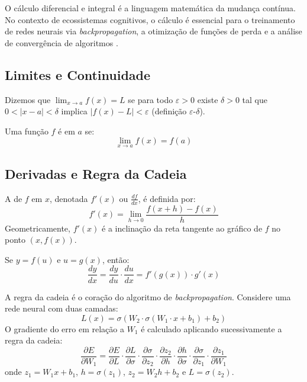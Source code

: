 O cálculo diferencial e integral é a linguagem matemática da mudança
contínua. No contexto de ecossistemas cognitivos, o cálculo é essencial para
o treinamento de redes neurais via \textit{backpropagation}, a otimização de
funções de perda e a análise de convergência de algoritmos
\cite{goodfellow2016deep, bishop2006pattern}.

\subsection{Limites e Continuidade}

\begin{definicao}
    Dizemos que $\lim_{x \to a} f(x) = L$ se para todo $\varepsilon > 0$
    existe $\delta > 0$ tal que $0 < |x - a| < \delta$ implica
    $|f(x) - L| < \varepsilon$ (definição $\varepsilon$-$\delta$).
\end{definicao}

\begin{definicao}[Continuidade]
    Uma função $f$ é  em $a$ se:
    \[
    \lim_{x \to a} f(x) = f(a)
    \]
\end{definicao}

\subsection{Derivadas e Regra da Cadeia}

\begin{definicao}[Derivada]
    A  de $f$ em $x$, denotada $f'(x)$ ou
    $\frac{df}{dx}$, é definida por:
    \[
    f'(x) = \lim_{h \to 0} \frac{f(x + h) - f(x)}{h}
    \]
    Geometricamente, $f'(x)$ é a inclinação da reta tangente ao gráfico de
    $f$ no ponto $(x, f(x))$.
\end{definicao}

\begin{teorema}
    Se $y = f(u)$ e $u = g(x)$, então:
    \[
    \frac{dy}{dx} = \frac{dy}{du} \cdot \frac{du}{dx} = f'(g(x)) \cdot g'(x)
    \]
\end{teorema}

\begin{exemplo}
    A regra da cadeia é o coração do algoritmo de \textit{backpropagation}.
    Considere uma rede neural com duas camadas:
    \[
    L(x) = \sigma(W_2 \cdot \sigma(W_1 \cdot x + b_1) + b_2)
    \]
    O gradiente do erro em relação a $W_1$ é calculado aplicando
    sucessivamente a regra da cadeia:
    \[
    \frac{\partial E}{\partial W_1} = \frac{\partial E}{\partial L} \cdot
    \frac{\partial L}{\partial \sigma} \cdot
    \frac{\partial \sigma}{\partial z_2} \cdot
    \frac{\partial z_2}{\partial h} \cdot
    \frac{\partial h}{\partial \sigma} \cdot
    \frac{\partial \sigma}{\partial z_1} \cdot
    \frac{\partial z_1}{\partial W_1}
    \]
    onde $z_1 = W_1 x + b_1$, $h = \sigma(z_1)$, $z_2 = W_2 h + b_2$ e
    $L = \sigma(z_2)$.
\end{exemplo}

